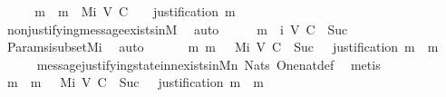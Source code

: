 \begin{isabellebody}
%
\isadelimproof
%
\endisadelimproof
%
\isatagproof
{}\isamarkupfalse%
\ {\isacharminus}\isanewline
\ \ \isamarkupfalse%
\ m\ \ {\isachardoublequoteopen}m\ {\isasymin}\ M{\isacharunderscore}i\ {\isacharparenleft}V{\isacharcomma}\ C{\isacharcomma}\ {\isasymepsilon}{\isacharparenright}\ {}\ {\isasymand}\ justification\ m\ {\isacharequal}\ {\isasymemptyset}{\isachardoublequoteclose}\isanewline
\ \ \ \ \isamarkupfalse%
\ non{\isacharunderscore}justifying{\isacharunderscore}message{\isacharunderscore}exists{\isacharunderscore}in{\isacharunderscore}M{\isacharunderscore}{}\ \isamarkupfalse%
\ auto\isanewline
\ \ \isamarkupfalse%
\ \isamarkupfalse%
\ {\isachardoublequoteopen}{\isacharbraceleft}m{\isacharbraceright}\ {\isasymin}\ {\isasymSigma}{\isacharunderscore}i\ {\isacharparenleft}V{\isacharcomma}\ C{\isacharcomma}\ {\isasymepsilon}{\isacharparenright}\ {\isacharparenleft}Suc\ {}{\isacharparenright}{\isachardoublequoteclose}\isanewline
\ \ \ \ \isamarkupfalse%
\ Params{\isachardot}{\isasymSigma}i{\isacharunderscore}subset{\isacharunderscore}Mi\ \isamarkupfalse%
\ auto\isanewline
\ \ \isamarkupfalse%
\ \isamarkupfalse%
\ {\isachardoublequoteopen}{\isasymexists}\ m{\isacharprime}{\isachardot}\ m{\isacharprime}\ {\isasymin}\ \ M{\isacharunderscore}i\ {\isacharparenleft}V{\isacharcomma}\ C{\isacharcomma}\ {\isasymepsilon}{\isacharparenright}\ {\isacharparenleft}Suc\ {}{\isacharparenright}\ {\isasymand}\ justification\ m{\isacharprime}\ {\isacharequal}\ {\isacharbraceleft}m{\isacharbraceright}{\isachardoublequoteclose}\isanewline
\ \ \ \ \isamarkupfalse%
\ message{\isacharunderscore}justifying{\isacharunderscore}state{\isacharunderscore}in{\isacharunderscore}{\isasymSigma}{\isacharunderscore}n{\isacharunderscore}exists{\isacharunderscore}in{\isacharunderscore}M{\isacharunderscore}n\ Nats{\isacharunderscore}{}\ One{\isacharunderscore}nat{\isacharunderscore}def\ \isamarkupfalse%
\ metis\isanewline
\ \ \isamarkupfalse%
\ \isamarkupfalse%
\ m{\isacharprime}\ \ {\isachardoublequoteopen}m{\isacharprime}\ {\isasymin}\ \ M{\isacharunderscore}i\ {\isacharparenleft}V{\isacharcomma}\ C{\isacharcomma}\ {\isasymepsilon}{\isacharparenright}\ {\isacharparenleft}Suc\ {}{\isacharparenright}\ {\isasymand}\ justification\ m{\isacharprime}\ {\isacharequal}\ {\isacharbraceleft}m{\isacharbraceright}{\isachardoublequoteclose}\ \isamarkupfalse%

\end{isabellebody}

